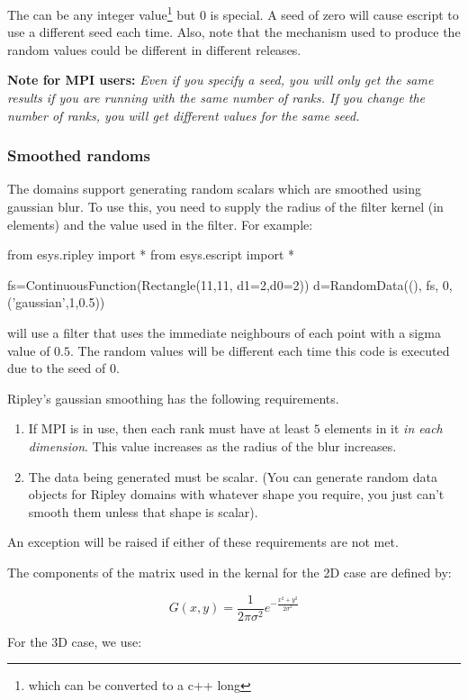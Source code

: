 The  can be any integer value\footnote{which can be converted to a c++ long} but 0 is special.
A seed of zero will cause escript to use a different seed each time. Also, note that the mechanism used
to produce the random values could be different in different releases.

\noindent\textbf{Note for MPI users:}
\textsl{
Even if you specify a seed, you will only get the same results if you are running with the same
number of ranks.
If you change the number of ranks, you will get different values for the same seed.
}

\subsubsection{Smoothed randoms}
The  domains support generating random scalars which are smoothed using gaussian blur.
To use this, you need to supply the radius of the filter kernel (in elements) and the  value used in the filter.
For example:
\begin{python}
from esys.ripley import *
from esys.escript import *

fs=ContinuousFunction(Rectangle(11,11, d1=2,d0=2))
d=RandomData((), fs, 0, ('gaussian',1,0.5))
\end{python}
will use a filter that uses the immediate neighbours of each point with a sigma value of $0.5$.
The random values will be different each time this code is executed due to the seed of $0$.

Ripley's gaussian smoothing has the following requirements.
\begin{enumerate}
 \item If MPI is in use, then each rank must have at least $5$ elements in it \emph{in each dimension}.
   This value increases as the radius of the blur increases.
 \item The data being generated must be scalar. (You can generate random data objects for Ripley domains
 with whatever shape you require, you just can't smooth them unless that shape is scalar).
\end{enumerate}
An exception will be raised if either of these requirements are not met. 

The components of the matrix used in the kernal for the 2D case are defined\cite{gaussfilter} by:

\[ G(x,y) = \frac{1}{2\pi\sigma^2} e^{-\frac{x^2+y^2}{2\sigma^2}} \]

For the 3D case, we use:

